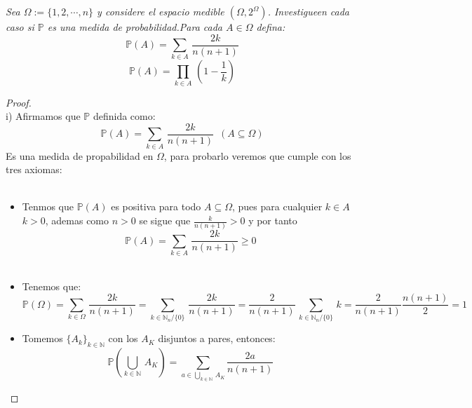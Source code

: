 \documentclass[11pt,letterpaper]{article}
\newcommand{\N}{\mathbb{N}}
\begin{document}
\begin{tcolorbox}[
	title = \textcolor{black}{\textcolor{white}{Problema 2}},]
\textit{Sea $\Omega:=\{1,2,\cdots,n\}$ y considere el espacio medible $(\Omega,2^{\Omega})$. Investigueen cada caso si $\mathbb{P}$
es una medida de probabilidad.Para cada $A\in \Omega$ defina:\,\\
\begin{equation*}
    \mathbb{P}(A)=\sum_{k\in A}\,\frac{2k}{n(n+1)}
\end{equation*}
\begin{equation*}
    \mathbb{P}(A)=\prod _{k\in A}\,\left(1-\frac{1}{k}\right)
\end{equation*}}
\end{tcolorbox}
\begin{proof}\,\\
    i)\,\,Afirmamos que $\mathbb{P}$ definida como:\,\\
    \begin{equation*}
        \mathbb{P}(A)=\sum_{k\in A}\,\frac{2k}{n(n+1)}\,\,\,(A\subseteq \Omega)
    \end{equation*}
    Es una medida de propabilidad en $\Omega$, para probarlo veremos que cumple con los tres axiomas:\,\\
    \,\\
    \begin{itemize}
        \item Tenmos que $\mathbb{P}(A)$ es positiva para todo $A\subseteq \Omega$, pues para cualquier $k\in A$ $k>0$, ademas como $n>0$ se sigue que 
        $\frac{k}{n(n+1)}>0$ y por tanto\,\\
        \begin{equation*}
            \mathbb{P}(A)=\sum_{k\in A}\,\frac{2k}{n(n+1)}\geq 0
        \end{equation*}\,\\
        \item Tenemos que:\,\\
        \begin{equation*}
            \mathbb{P}(\Omega)=\sum_{k\in \Omega}\,\frac{2k}{n(n+1)}=\sum_{k\in \N_n/ \{0\}}\,\frac{2k}{n(n+1)}=\frac{2}{n(n+1)}\,\sum_{k\in\N_n/\{0\}}\,k=\frac{2}{n(n+1)}\frac{n(n+1)}{2}=1
        \end{equation*}
        \item Tomemos $\{A_k\}_{k\in\N}$ con los $A_K$ disjuntos a pares, entonces:\,\\
        \begin{equation*}
            \mathbb{P}\left(\bigcup_{k\in \N}\,A_K\right)=\sum_{a\in \bigcup_{k\in \N}\,A_K}\frac{2a}{n(n+1)}

\end{equation*}
\end{itemize}
\end{proof}
\end{document}
